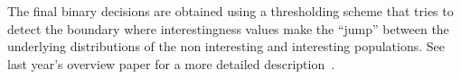 \documentclass[sigconf]{acmart-me}
\begin{document}
The final binary decisions are obtained using a thresholding scheme that tries to detect the boundary where interestingness values make the ``jump'' between the underlying distributions of the non interesting and interesting populations.  See last year's overview paper for a more detailed description~\cite{demarty2016mediaeval}.

  
\end{document}
